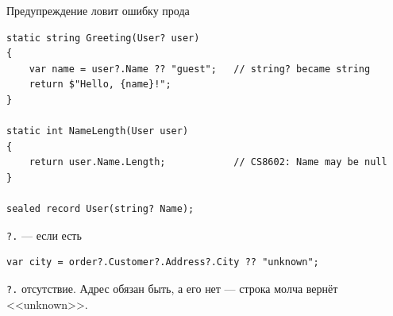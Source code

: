 \documentclass[aspectratio=169,10pt,t]{beamer}
\begin{document}
\begin{frame}[fragile]{Предупреждение ловит ошибку прода}
  \slidetop
\begin{lstlisting}[style=csharp,basicstyle=\ttfamily\small]
static string Greeting(User? user)
{
    var name = user?.Name ?? "guest";   // string? became string
    return $"Hello, {name}!";
}

static int NameLength(User user)
{
    return user.Name.Length;            // CS8602: Name may be null
}

sealed record User(string? Name);
\end{lstlisting}
  \vspace{0.4em}
\end{frame}

\begin{frame}[fragile]{\texttt{?.} --- если есть}
  \slidetop

\begin{lstlisting}[style=csharp,basicstyle=\ttfamily\small]
var city = order?.Customer?.Address?.City ?? "unknown";
\end{lstlisting}
  \vspace{0.6em}

  \slidegap
  {\large \texttt{?.}  отсутствие. Адрес обязан быть, а его нет
    --- строка молча вернёт <<unknown>>.}
\end{frame}
\end{document}
